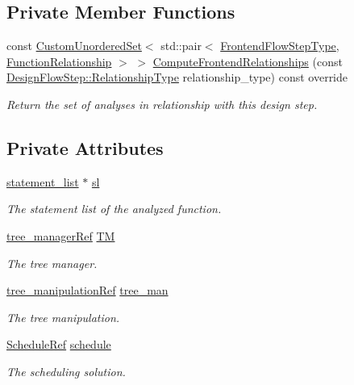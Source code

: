 \subsection*{Private Member Functions}
\begin{DoxyCompactItemize}
\item 
const \hyperlink{classCustomUnorderedSet}{Custom\+Unordered\+Set}$<$ std\+::pair$<$ \hyperlink{frontend__flow__step_8hpp_afeb3716c693d2b2e4ed3e6d04c3b63bb}{Frontend\+Flow\+Step\+Type}, \hyperlink{classFrontendFlowStep_af7cf30f2023e5b99e637dc2058289ab0}{Function\+Relationship} $>$ $>$ \hyperlink{classRemoveEndingIf_a028dba75b4b90e6a322030b4a2d6eebe}{Compute\+Frontend\+Relationships} (const \hyperlink{classDesignFlowStep_a723a3baf19ff2ceb77bc13e099d0b1b7}{Design\+Flow\+Step\+::\+Relationship\+Type} relationship\+\_\+type) const override
\begin{DoxyCompactList}\small\item\em Return the set of analyses in relationship with this design step. \end{DoxyCompactList}\end{DoxyCompactItemize}
\subsection*{Private Attributes}
\begin{DoxyCompactItemize}
\item 
\hyperlink{structstatement__list}{statement\+\_\+list} $\ast$ \hyperlink{classRemoveEndingIf_a03e48ca6bfca1325ba4ec0efa6de4b07}{sl}
\begin{DoxyCompactList}\small\item\em The statement list of the analyzed function. \end{DoxyCompactList}\item 
\hyperlink{tree__manager_8hpp_a96ff150c071ce11a9a7a1e40590f205e}{tree\+\_\+manager\+Ref} \hyperlink{classRemoveEndingIf_a1f7b5de0a7120ec43e2ba80e9ff6a2fb}{TM}
\begin{DoxyCompactList}\small\item\em The tree manager. \end{DoxyCompactList}\item 
\hyperlink{tree__manipulation_8hpp_a1a9460e3a2f9fc6a96cfd2f24cc9b2a5}{tree\+\_\+manipulation\+Ref} \hyperlink{classRemoveEndingIf_a7136fb1720ad7497db9d77e6b6978dad}{tree\+\_\+man}
\begin{DoxyCompactList}\small\item\em The tree manipulation. \end{DoxyCompactList}\item 
\hyperlink{schedule_8hpp_af67f402958b3b52a1ec5cc4ce08ae3b9}{Schedule\+Ref} \hyperlink{classRemoveEndingIf_a3cea7c861318dbdb39b0e617fe9b5456}{schedule}
\begin{DoxyCompactList}\small\item\em The scheduling solution. \end{DoxyCompactList}\end{DoxyCompactItemize}
